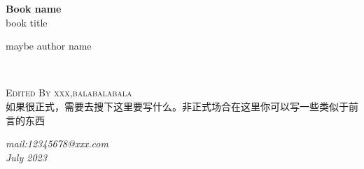 \documentclass[11pt,fleqn, openany]{book} %
\begin{document}

\begingroup
\thispagestyle{empty}
\centering
\vspace*{5cm}
\par\normalfont\fontsize{35}{35}\sffamily\selectfont
\textbf{Book name}\\
{\LARGE book title}\par %
\vspace*{1cm}
{\Huge maybe author name}\par %
\endgroup


\newpage
~\vfill
\thispagestyle{empty}


\noindent \textsc{Edited By xxx,balabalabala}\\


如果很正式，需要去搜下这里要写什么。非正式场合在这里你可以写一些类似于前言的东西
 

\textit{mail:12345678@xxx.com}\\

\noindent \textit{July 2023} %



\pagestyle{empty} %

\tableofcontents %


\pagestyle{fancy} %
\end{document}

